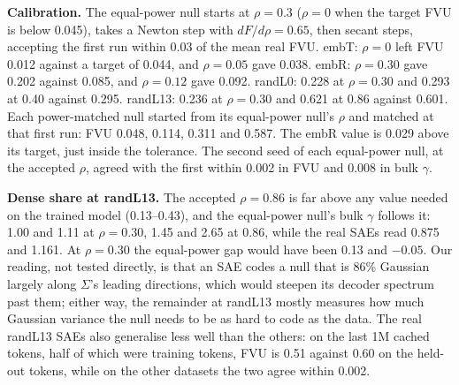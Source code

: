 \documentclass{article}
\newcommand{\Sig}{\Sigma}
\begin{document}
\begin{table}[!htb]
\centering
\caption{Ladder datasets and their trained counterparts. $\Sig$: top-1 and top-10 eigenvalue shares and participation ratio (PR), and $\Sig$'s slope with the $R^2$ of its log-log fit in the two bulk windows. Cloud fit: smallest $R^2$ over the real, equal-power and power-matched decoder clouds (fixed-$n$ mean spectrum) in ranks 31--450 / 101--1000. Live latents: smallest count among the real, equal-power and power-matched SAEs. Top-1\% power: share of latent power on the top 1\% of latents for the real seed-0 SAE, of atom power for the power-matched dictionary, and of latent power for the SAE trained on it.}
\label{tab:ladder_detail}
\footnotesize
\setlength{\tabcolsep}{2.5pt}

\end{table}

\textbf{Calibration.} The equal-power null starts at $\rho=0.3$ ($\rho=0$ when the target FVU is below 0.045), takes a Newton step with $dF/d\rho=0.65$, then secant steps, accepting the first run within 0.03 of the mean real FVU. embT: $\rho=0$ left FVU 0.012 against a target of 0.044, and $\rho=0.05$ gave 0.038. embR: $\rho=0.30$ gave 0.202 against 0.085, and $\rho=0.12$ gave 0.092. randL0: 0.228 at $\rho=0.30$ and 0.293 at 0.40 against 0.295. randL13: 0.236 at $\rho=0.30$ and 0.621 at 0.86 against 0.601. Each power-matched null started from its equal-power null's $\rho$ and matched at that first run: FVU 0.048, 0.114, 0.311 and 0.587. The embR value is 0.029 above its target, just inside the tolerance. The second seed of each equal-power null, at the accepted $\rho$, agreed with the first within 0.002 in FVU and 0.008 in bulk $\gamma$.

\textbf{Dense share at randL13.} The accepted $\rho=0.86$ is far above any value needed on the trained model (0.13--0.43), and the equal-power null's bulk $\gamma$ follows it: 1.00 and 1.11 at $\rho=0.30$, 1.45 and 2.65 at 0.86, while the real SAEs read 0.875 and 1.161. At $\rho=0.30$ the equal-power gap would have been 0.13 and $-0.05$. Our reading, not tested directly, is that an SAE codes a null that is 86\% Gaussian largely along $\Sig$'s leading directions, which would steepen its decoder spectrum past them; either way, the remainder at randL13 mostly measures how much Gaussian variance the null needs to be as hard to code as the data. The real randL13 SAEs also generalise less well than the others: on the last 1M cached tokens, half of which were training tokens, FVU is 0.51 against 0.60 on the held-out tokens, while on the other datasets the two agree within 0.002.
\end{document}
